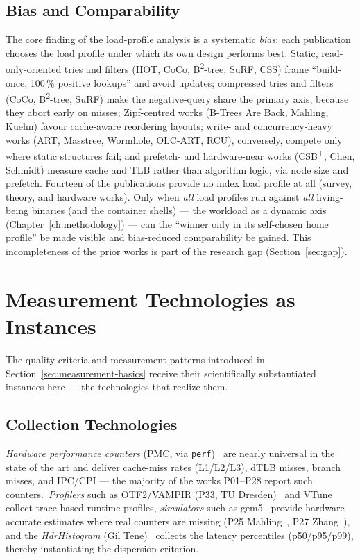 \subsection{Bias and Comparability}\label{ssec:sota-wl-bias}
The core finding of the load-profile analysis is a systematic \emph{bias}: each publication chooses
the load profile under which its own design performs best. Static, read-only-oriented tries and
filters (HOT, CoCo, B\textsuperscript{2}-tree, SuRF, CSS) frame ``build-once, 100\,\% positive
lookups'' and avoid updates; compressed tries and filters (CoCo, B\textsuperscript{2}-tree, SuRF)
make the negative-query share the primary axis, because they abort early on misses; Zipf-centred
works (B-Trees Are Back, Mahling, Kuehn) favour cache-aware reordering layouts; write- and
concurrency-heavy works (ART, Masstree, Wormhole, OLC-ART, RCU), conversely, compete only where
static structures fail; and prefetch- and hardware-near works (CSB\textsuperscript{+}, Chen,
Schmidt) measure cache and TLB rather than algorithm logic, via node size and prefetch. Fourteen of
the publications provide no index load profile at all (survey, theory, and hardware works). Only
when \emph{all} load profiles run against \emph{all} living-being binaries (and the container
shells) --- the workload as a dynamic axis (Chapter~\ref{ch:methodology}) --- can the ``winner only
in its self-chosen home profile'' be made visible and bias-reduced comparability be gained. This
incompleteness of the prior works is part of the research gap (Section~\ref{sec:gap}).

\section{Measurement Technologies as Instances}\label{sec:sota-measurement}
The quality criteria and measurement patterns introduced in Section~\ref{sec:measurement-basics}
receive their scientifically substantiated instances here --- the technologies that realize them.

\subsection{Collection Technologies}\label{ssec:sota-meas-tech}
\emph{Hardware performance counters} (PMC, via \texttt{perf})~\cite{demelo2010perf} are nearly
universal in the state of the art and deliver cache-miss rates (L1/L2/L3), dTLB misses, branch
misses, and IPC/CPI --- the majority of the works P01--P28 report such counters.\ \emph{Profilers}
such as OTF2/VAMPIR (P33, TU Dresden)~\cite{berthold2023vampir} and VTune~\cite{reinders2005vtune}
collect trace-based runtime profiles, \emph{simulators} such as gem5~\cite{binkert2011gem5} provide
hardware-accurate estimates where real counters are missing (P25 Mahling~\cite{mahling2025hotpath},
P27 Zhang~\cite{zhang2025hierarchical}), and the \emph{HdrHistogram} (Gil
Tene)~\cite{tene_hdrhistogram} collects the latency percentiles (p50/p95/p99), thereby instantiating
the dispersion criterion.

